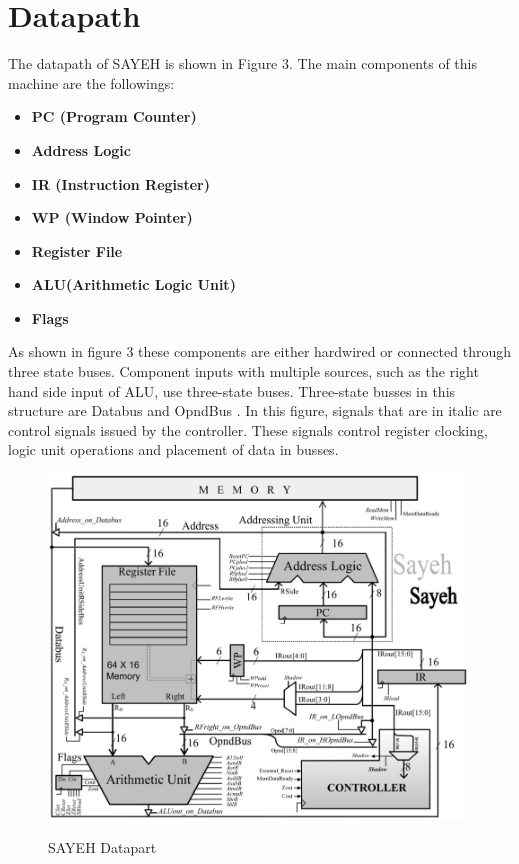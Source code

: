 \documentclass{report}
\begin{document}
\section{Datapath}
    The datapath of SAYEH is shown in Figure 3. The main components of this machine are the followings:
    \begin{itemize}
        \item \textbf{PC (Program Counter)}
        \item \textbf{Address Logic}
        \item \textbf{IR (Instruction Register)}
        \item \textbf{WP (Window Pointer)}
        \item \textbf{Register File}
        \item \textbf{ALU(Arithmetic Logic Unit)}
        \item \textbf{Flags}
    \end{itemize}    
    
    \par As shown in figure 3 these components are either hardwired or connected through three state buses. Component inputs with multiple sources, such as the right hand side input of ALU, use three-state buses. Three-state busses in this structure are Databus and OpndBus . In this figure, signals that are in italic are control signals issued by the controller. These signals control register clocking, logic unit operations and placement of data in busses.
    
    \begin{figure}[ht]
        \centering
        \includegraphics[width=0.99\textwidth]{figs/fig3}\\
        \caption{SAYEH Datapart}
    \end{figure}
    
\end{document}
